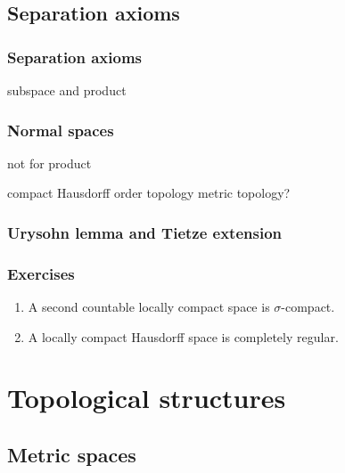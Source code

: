 \documentclass{../../large}
\begin{document}
\chapter{Separation axioms}
\section{Separation axioms}
subspace and product


\section{Normal spaces}
not for product

compact Hausdorff
order topology
metric topology?

\section{Urysohn lemma and Tietze extension}



\section*{Exercises}
\begin{prb}
\end{prb}
\begin{prb}
\end{prb}
\begin{prb}
\end{prb}
\begin{prb}
\end{prb}
\begin{prb}
\end{prb}


\begin{enumerate}
\item A second countable locally compact space is $\sigma$-compact.
\item A locally compact Hausdorff space is completely regular.
\end{enumerate}


\part{Topological structures}

\chapter{Metric spaces}
\end{document}
